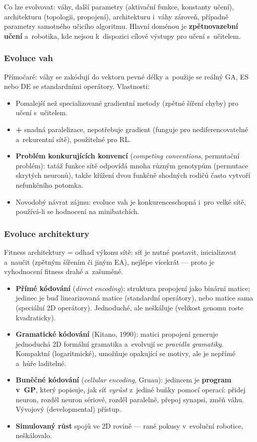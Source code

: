 \documentclass[11pt,a4paper]{article}
\theoremstyle{definition}
\begin{document}
Co lze evolvovat: váhy, další parametry (aktivační funkce, konstanty učení),
architekturu (topologii, propojení), architekturu i~váhy zároveň, případně
parametry samotného učicího algoritmu. Hlavní doménou je
\textbf{zpětnovazební učení} a~robotika, kde nejsou k~dispozici cílové výstupy
pro učení s~učitelem.

\subsubsection{Evoluce vah}

Přímočaré: váhy se zakódují do vektoru pevné délky a~použije se reálný GA,
ES nebo DE se standardními operátory. Vlastnosti:
\begin{itemize}
\item Pomalejší než specializované gradientní metody (zpětné šíření chyby)
  pro učení s~učitelem.
\item \textbf{+} snadná paralelizace, nepotřebuje gradient (funguje pro
  nediferencovatelné a~rekurentní sítě), použitelné pro RL.
\item \textbf{Problém konkurujících konvencí} (\emph{competing conventions},
  permutační problém): tatáž funkce sítě odpovídá mnoha různým genotypům
  (permutace skrytých neuronů), takže křížení dvou funkčně shodných rodičů
  často vytvoří nefunkčního potomka.
\item Novodobý návrat zájmu: evoluce vah je konkurenceschopná i~pro velké
  sítě, používá-li se hodnocení na minibatchích.
\end{itemize}

\subsubsection{Evoluce architektury}

Fitness architektury = odhad výkonu sítě: síť je nutné postavit, inicializovat
a~naučit (zpětným šířením či jiným EA), nejlépe vícekrát --- proto je
vyhodnocení fitness drahé a~zašuměné.

\begin{itemize}
\item \textbf{Přímé kódování} (\emph{direct encoding}): struktura propojení jako
  binární matice; jedinec je buď linearizovaná matice (standardní operátory),
  nebo matice sama (speciální 2D operátory). Jednoduché, ale neškáluje
  (velikost genomu roste kvadraticky).
\item \textbf{Gramatické kódování} (Kitano, 1990): matici propojení generuje
  jednoduchá 2D formální gramatika a~evolvují se \emph{pravidla gramatiky}.
  Kompaktní (logaritmické), umožňuje opakující se motivy, ale je nepřímé
  a~hůře laditelné.
\item \textbf{Buněčné kódování} (\emph{cellular encoding}, Gruau): jedincem je
  \textbf{program v~GP}, který popisuje, jak síť \emph{vyrůst} z~jediné buňky
  pomocí operací: přidej neuron, rozděl neuron sériově, rozděl paralelně,
  přepoj synapsi, změň váhu. Vývojový (developmental) přístup.
\item \textbf{Simulovaný růst} spojů ve 2D rovině --- rané pokusy v~evoluční
  robotice, neškálovalo.
\end{itemize}
\end{document}
